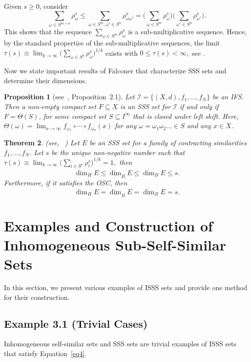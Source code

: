 \documentclass[12pt,oneside,reqno]{amsart}
\newtheorem{theorem}{Theorem}[section]
\newtheorem{proposition}[theorem]{Proposition}
\theoremstyle{definition}
\theoremstyle{remark}
\begin{document}
Given $s\ge0$, consider
$$\sum_{\omega \in S^{m+n}} \rho_\omega^s \le \sum_{\omega \in S^m, \omega' \in S^n} \rho_{\omega \omega'}^s = \bigg(\sum_{\omega \in S^m} \rho_{\omega}^s \bigg) \bigg(\sum_{\omega' \in S^n} \rho_{\omega'}^s\bigg).$$
This shows that the sequence $\sum_{\omega \in S^m} \rho_{\omega}^s$ is a sub-multiplicative sequence. Hence, by the standard properties of the sub-multiplicative sequences, the limit $\tau(s) \equiv \lim_{k \to \infty} \bigg( \sum_{\omega \in S^k} \rho_{\omega}^s \bigg)^{1/k}$
exists with $0 \le \tau(s) < \infty,$ see \cite{Fal1}.


 Now we state important results of Falconer \cite{Fal1} that characterize SSS sets and determine their dimensions.

\begin{proposition}[see~\cite{Fal1}, Proposition~2.1]
\label{prop2.1}
Let $\mathcal{I} = \{(X, d), f_1, \ldots, f_N\}$ be an IFS. Then a non-empty compact set $F \subseteq X$ is an SSS set for $\mathcal{I}$ if and only if $F = \Theta(S)$, for some compact set $S \subseteq I^\infty$ that is closed under left shift. Here, $\Theta(\omega) = \lim_{n \to \infty} f_{\omega_1}\circ \cdots \circ f_{\omega_n}(x)$ for any $\omega = \omega_1 \omega_2 \dots \in S$ and any $x \in X$.
\end{proposition}

\begin{theorem}\label{thm51}(see, ~\cite[Theorem~ 3.5]{Fal1})
    Let $E$ be an SSS set for a family of contracting similarities $f_1,\ldots,f_N$. Let $s$ be the unique non-negative number such that 
    $\tau(s)\equiv \lim_{k \to \infty} \bigg( \sum_{i \in S^k} \rho_{i}^s \bigg)^{1/k} =1,$ then
    $$\dim_{H} E \le \underline{\dim}_B E \le \overline{\dim}_B E \le s.$$
    Furthermore, if it satisfies the OSC, then
    $$\dim_{H} E = \underline{\dim}_B E = \overline{\dim}_B E = s.$$
\end{theorem}

\section{Examples and Construction of Inhomogeneous Sub-Self-Similar Sets}

In this section, we present various examples of ISSS sets and provide one method for their construction.

\subsection*{Example 3.1 (Trivial Cases)}
Inhomogeneous self-similar sets and SSS sets are trivial examples of ISSS sets that satisfy Equation~\eqref{eq4}.
\end{document}
